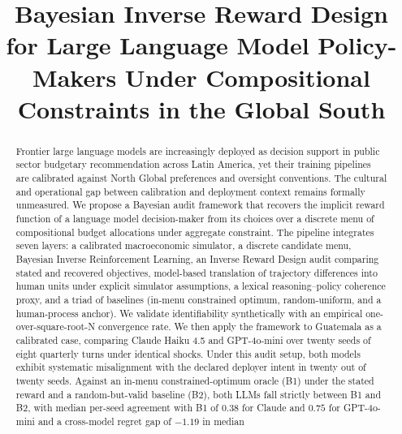 \documentclass[conference]{IEEEtran}
\begin{document}
\title{Bayesian Inverse Reward Design for Large Language Model Policy-Makers Under Compositional Constraints in the Global South}

\author{
}

\maketitle

\begin{abstract}
Frontier large language models are increasingly deployed as decision
support in public sector budgetary recommendation across Latin America,
yet their training pipelines are calibrated against North Global
preferences and oversight conventions. The cultural and operational
gap between calibration and deployment context remains formally
unmeasured. We propose a Bayesian audit framework that recovers the
implicit reward function of a language model decision-maker from its
choices over a discrete menu of compositional budget allocations under
aggregate constraint. The pipeline integrates seven layers: a
calibrated macroeconomic simulator, a discrete candidate menu,
Bayesian Inverse Reinforcement Learning, an Inverse Reward Design
audit comparing stated and recovered objectives, model-based
translation of trajectory differences into human units under explicit
simulator assumptions, a lexical reasoning--policy coherence proxy,
and a triad of baselines (in-menu constrained optimum, random-uniform,
and a human-process anchor). We validate identifiability synthetically
with an empirical one-over-square-root-N convergence rate. We then
apply the framework to Guatemala as a calibrated case, comparing
Claude Haiku 4.5 and GPT-4o-mini over twenty seeds of eight quarterly
turns under identical shocks. Under this audit setup, both models
exhibit systematic misalignment with the declared deployer intent in
twenty out of twenty seeds. Against an in-menu constrained-optimum
oracle (B1) under the stated reward and a random-but-valid baseline
(B2), both LLMs fall strictly between B1 and B2, with median
per-seed agreement with B1 of $0.38$ for Claude and $0.75$ for
GPT-4o-mini and a cross-model regret gap of $-1.19$ in median

\end{abstract}
\end{document}
